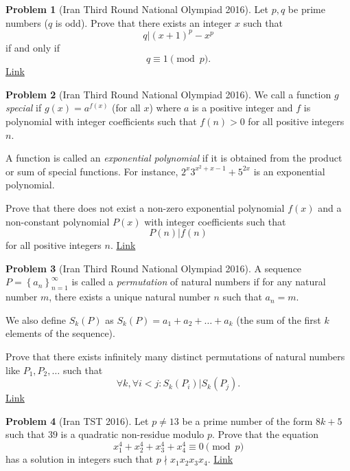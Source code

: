 \documentclass[]{article}
\theoremstyle{definition}
\newtheorem{problem}{Problem}
\begin{document}
\begin{problem}[Iran Third Round National Olympiad 2016]
	Let $p,q$ be prime numbers ($q$ is odd). Prove that there exists an integer $x$ such that
	$$q |(x+1)^p-x^p$$
	if and only if $$q \equiv 1 \pmod p.$$
	\flushright \href{http://artofproblemsolving.com/community/c6h1300984p6930188}{Link}
\end{problem}




\begin{problem}[Iran Third Round National Olympiad 2016]
	We call a function $g$ \textit{special} if $g(x)=a^{f(x)}$ (for all $x$) where $a$ is a positive integer and $f$ is polynomial with integer coefficients such that $f(n)>0$ for all positive integers $n$.
	
	A function is called an \textit{exponential polynomial} if it is obtained from the product or sum of special functions. For instance, $2^{x}3^{x^{2}+x-1}+5^{2x}$ is an exponential polynomial.
	
	Prove that there does not exist a non-zero exponential polynomial $f(x)$ and a non-constant polynomial $P(x)$ with integer coefficients such that
	$$P(n)|f(n)$$for all positive integers $n$. \hfill \href{http://artofproblemsolving.com/community/c6h1300987p6930211}{Link}
\end{problem}




\begin{problem}[Iran Third Round National Olympiad 2016]
	A sequence $P=\left \{ a_{n} \right \}_{n=1}^{\infty}$ is called a \textit{permutation} of natural numbers if for any natural number $m$, there exists a unique natural number $n$ such that $a_n=m.$
	
	We also define $S_k(P)$ as
	$S_k(P)=a_{1}+a_{2}+\dots +a_{k}$ (the sum of the first $k$ elements of the sequence).
	
	Prove that there exists infinitely many distinct permutations of natural numbers like $P_1,P_2, \dots$ such that
	$$\forall k, \forall i<j: S_k(P_i)|S_k(P_j).$$
	\flushright \href{http://artofproblemsolving.com/community/c6h1300990p6930248}{Link}
\end{problem}




\begin{problem}[Iran TST 2016]
	Let $p \neq 13$ be a prime number of the form $8k+5$ such that $39$ is a quadratic non-residue modulo $p$. Prove that the equation $$x_1^4+x_2^4+x_3^4+x_4^4 \equiv 0 \pmod p$$ has a solution in integers such that $p\nmid x_1x_2x_3x_4$. \hfill \href{http://artofproblemsolving.com/community/c6h1272976p6661198}{Link}
\end{problem}
\end{document}
